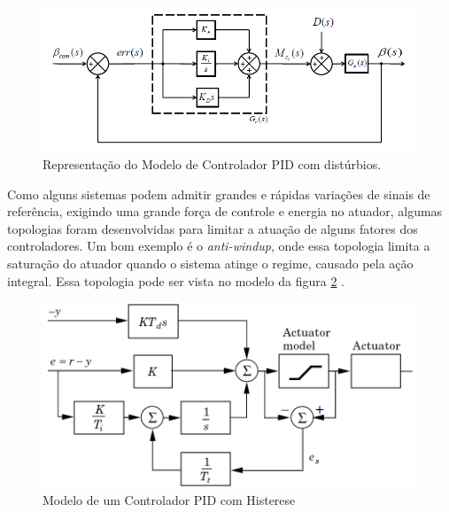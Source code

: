 \begin{figure}[!ht]
  \caption{Representação do Modelo de Controlador PID com distúrbios.}
  \begin{center}
      \includegraphics[scale=0.75]{img/pid_controller_Snider_p35}
  \end{center}
  \label{fig:pid_controller_Snider_p35}
\end{figure}

Como alguns sistemas podem admitir grandes e rápidas variações de sinais de referência, exigindo uma grande força de controle e energia no atuador, algumas topologias foram desenvolvidas para limitar a atuação de alguns fatores dos controladores. Um bom exemplo é o \textit{anti-windup}, onde essa topologia limita a saturação do atuador quando o sistema atinge o regime, causado pela ação integral. Essa topologia pode ser vista no modelo da figura \ref{fig:pid_antiwindup_astrom_p83} \cite{Astrom1995}.

\begin{figure}[!ht]
  \caption{Modelo de um Controlador PID com Histerese}
  \begin{center}
      \includegraphics[scale=0.65]{img/pid_antiwindup_astrom_p83}
  \end{center}
  \label{fig:pid_antiwindup_astrom_p83}
\end{figure}

